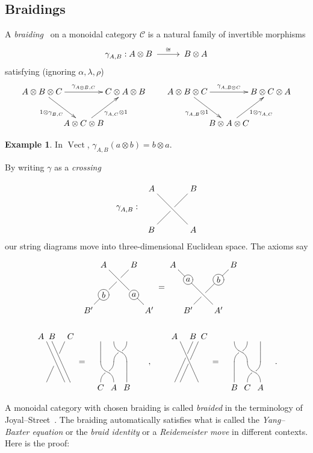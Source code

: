 \documentclass[a4paper,12pt]{article}
\makeatletter
\theoremstyle{definition}
\newtheorem*{Example}{Example}%
\theoremstyle{fact}
\theoremstyle{genquest}
\theoremstyle{step}
\newcommand{\catC}{\mathcal{C}}
\newcommand{\Vect}{\operatorname{Vect}}
\newcommand{\longto}{\longrightarrow}
\newcommand{\xylongto}[2][2pt]{{\UseTips{}\xymatrix @C+#1{ \ar[r]^{#2}&}}}
\makeatother
\begin{document}
\subsection{Braidings}

A \textit{braiding}~\cite{BTC} on a monoidal category $\catC$ is a natural family of invertible morphisms 
\[
\gamma^{}_{A,B} : A \otimes B  \xylongto{\cong} %
 B \otimes A
\]
satisfying (ignoring $\alpha, \lambda, \rho$)
\[
 \xymatrix @C-10mm{
A \otimes B \otimes C \ar[rr]^{\gamma_{A\otimes B,C}^{}} \ar[rd]_-{1\otimes \gamma_{B,C}^{}} 
& & C \otimes A \otimes B  \\
& A \otimes C \otimes B\ar[ru]_-{\gamma_{A,C}^{} \otimes 1}}  
 \qquad 
\xymatrix @C-10mm{
A \otimes B \otimes C \ar[rr]^{\gamma_{A, B\otimes C}^{}} \ar[rd]_-{\gamma_{A,B}^{} \otimes 1} 
& & B \otimes C \otimes A  \\
& B \otimes A \otimes C \ar[ru]_-{1\otimes \gamma_{A,C}^{}}}   
\]

\begin{Example}
In $\Vect$, $\gamma^{}_{A,B} (a\otimes b) = b \otimes a$.
\end{Example}

\noindent
By writing $\gamma$ as a \emph{crossing}
\[
\xygraph{
 []{\gamma^{}_{A,B} :} [r][u(0.5)] *+!DR{A}( !{\xunderv}, [r]*+!DL{B} , [dr]*+!UL{A} ,  [d]*+!UR{B} )}
\]
our string diagrams move into three-dimensional Euclidean space.   The axioms say
\[
\xygraph{[u(.75)]*+{A} ( [r]*+{B} , [d(1.5)l(.5)]*+{B'} , [dr(1.5)]*+{A'},
  [d]*++=[o][Fo]{b}="b"-"B'" , [dr]*++=[o][Fo]{a}="a"-"A'" ,
!{\xunderv ~{"A"}{"B"}{"b"}{"a"}} 
  )}  = 
\xygraph{[u(.75)]*+{A} ( [rr]*+{B} , [d(1.5)r(.5)]*+{B'} , [dr(1.5)]*+{A'},
  [dr(.5)r]*++=[o][Fo]{b}="b"-"B" , [dr(.5)]*++=[o][Fo]{a}="a"-"A" ,
!{\xunderv ~{"a"}{"b"}{"B'"}{"A'"}} 
  )}  
\]
\[
\xygraph{ !{\knotholesize{15pt}}
!{/r1.8pc/: /u4pc/::}
[d(.5)] ( ?*+!DR{A} , [r] *+!DL{C}
 , !{\xunderv @(.45)}
, [r(.3)] ( ?*+!D{B} , ?- [rd]
))
}
=
\xygraph{
!{/r1.3pc/: /u2pc/::}
 !{\xcapv-@(0)}
!{\vtwistneg} ( []*+!U{C}  [r]*+!U{A}  [r]*+!U{B} ,
[uur] !{\vtwistneg}
[r]!{\xcapv@(0)}
)
}
\quad,\qquad
\xygraph{ %
!{/r1.8pc/: /u4pc/::}
[d(.5)] ( ?*+!DR{A} , [r(.7)] *+!D{B}  , [r] *+!DL{C} ,
!{\xunderv}
, [r(.7)] - [ld] |(.35)*{\khole}
}
= 
\xygraph{
!{/r1.3pc/: /u2pc/::}
[r] !{\vtwistneg}
!{\xcapv-@(0)}
[uurr]
!{\xcapv@(0)}
[l] !{\vtwistneg} 
[l]*+!U{B}  [r]*+!U{C}  [r]*+!U{A} 
}\,.
\]

A monoidal category with chosen braiding is called \emph{braided} in the terminology of Joyal--Street~\cite{BTC}. 
The braiding automatically satisfies what is called the \textit{Yang--Baxter equation} 
or the \textit{braid identity} or a \textit{Reidemeister move} in different contexts. 
Here is the proof:
\end{document}
